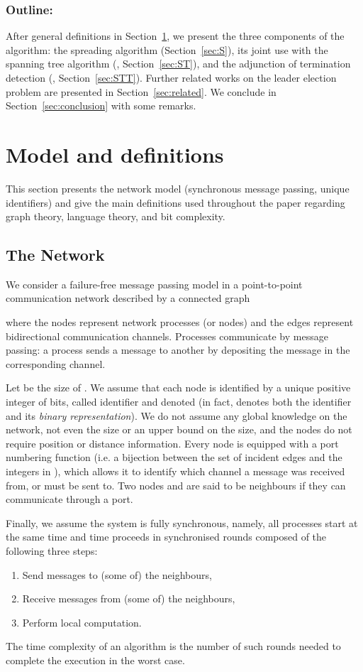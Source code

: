 \documentclass[11pt,envcountsame,letterpaper]{llncs}
\begin{document}
\subsubsection{Outline:} After general definitions in Section~\ref{sec:model}, we present the three components of the algorithm: the spreading algorithm 
(Section~\ref{sec:S}), its joint use with the spanning tree algorithm (, Section~\ref{sec:ST}), and the adjunction of termination detection (, Section~\ref{sec:STT}).
Further related works on the leader election problem are presented in Section~\ref{sec:related}.
We conclude in Section~\ref{sec:conclusion} with some remarks.

\section{Model and definitions}
\label{sec:model}

This section presents the network model (synchronous message passing, unique identifiers) and give the main definitions used throughout the paper regarding graph theory, language theory, and bit complexity.

\subsection{The Network}
We consider a failure-free message passing model
in a point-to-point
communication network described by a   connected graph 

where the nodes  represent network processes (or nodes) and the edges 
represent bidirectional communication channels. Processes communicate
by message passing: a process sends a message to another by depositing
the message in the corresponding channel. 

Let  be the size of .
We assume that each node   is identified by a unique
positive integer of  bits, called identifier and denoted 
(in fact,  denotes both the identifier and its {\em binary representation}).
 We do not assume any global knowledge on
the network, not even the size or an upper bound on the size, and the nodes do not require position or distance information. 
Every node is equipped with a port numbering function (i.e. a bijection between the set of incident edges  and the integers in ), which allows it to identify which channel a message was received from, or must be sent to.
Two nodes  and  are said to be neighbours if they can communicate
through a port.

Finally, we assume the system is
fully synchronous, namely, all processes start at the same time
and time proceeds in synchronised rounds composed of the following three
steps: 
\begin{enumerate}
\item Send messages to (some of) the neighbours, 
\item Receive
messages from (some of) the neighbours, 
\item Perform local
computation.
\end{enumerate}
  The time complexity of an algorithm is the number of such rounds needed to complete the execution in the worst case.
\end{document}
